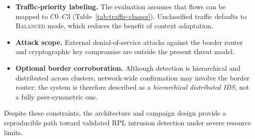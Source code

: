 \begin{itemize}
  \item \textbf{Traffic-priority labeling.} The evaluation assumes that flows can be mapped to $C0$--$C3$ (Table~\ref{tab:traffic-classes}).
  Unclassified traffic defaults to \textsc{Balanced} mode, which reduces the benefit of context adaptation.
  \item \textbf{Attack scope.} External denial-of-service attacks against the border router and cryptographic key compromise are outside the present threat model.
  \item \textbf{Optional border corroboration.} Although detection is hierarchical and distributed across clusters, network-wide confirmation may involve the border router; the system is therefore described as a \emph{hierarchical distributed IDS}, not a fully peer-symmetric one.
\end{itemize}

Despite these constraints, the architecture and campaign design provide a reproducible path toward validated RPL intrusion detection under severe resource limits.
